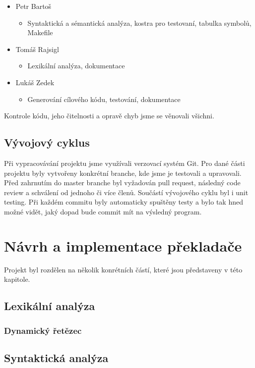 \documentclass[a4paper,12pt]{article}
\begin{document}
\begin{itemize}
	\item Petr Bartoš
	      \begin{itemize}
	      	\item Syntaktická a sémantická analýza, kostra pro testovaní, tabulka symbolů, Makefile
	      \end{itemize}
	\item Tomáš Rajsigl 
	      \begin{itemize}
	      	\item Lexikální analýza, dokumentace
	      \end{itemize}
	\item Lukáš Zedek
	      \begin{itemize}
	      	\item Generování cílového kódu, testování, dokumentace
	      \end{itemize}
\end{itemize}
Kontrole kódu, jeho čitelnosti a opravě chyb jsme se věnovali všichni.
\subsection{Vývojový cyklus}
Při vypracovávání projektu jsme využívali verzovací systém Git. Pro dané části projektu byly vytvořeny konkrétní branche, kde jsme je testovali a upravovali. Před zahrnutím do master branche byl vyžadován pull request, následný code review a schválení od jednoho či více členů. Součástí vývojového cyklu byl i unit testing. Při každém commitu byly automaticky spuštěny testy a bylo tak hned možné vidět, jaký dopad bude commit mít na výsledný program.

\section{Návrh a implementace překladače}
Projekt byl rozdělen na několik konrétních částí, které jsou představeny v této kapitole.
\clearpage

\subsection{Lexikální analýza}

\subsubsection{Dynamický řetězec}

\subsection{Syntaktická analýza}
\end{document}
